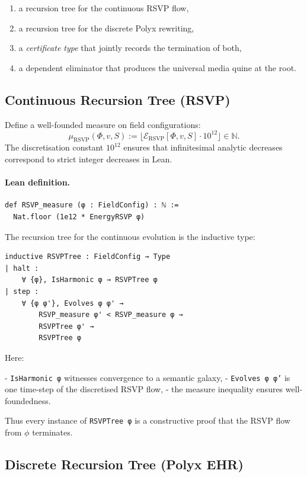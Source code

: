\begin{enumerate}
\item a recursion tree for the continuous RSVP flow,
\item a recursion tree for the discrete Polyx rewriting,
\item a \emph{certificate type} that jointly records the termination of both,
\item a dependent eliminator that produces the universal media quine at the root.
\end{enumerate}

\subsection{Continuous Recursion Tree (RSVP)}

Define a well-founded measure on field configurations:
\[
   \mu_{\mathrm{RSVP}}(\Phi,v,S)
     := \lfloor \mathcal{E}_{\mathrm{RSVP}}[\Phi,v,S] \cdot 10^{12} \rfloor
     \in \mathbb{N}.
\]
The discretisation constant $10^{12}$ ensures that infinitesimal analytic decreases correspond to strict integer decreases in Lean.

\paragraph{Lean definition.}

\begin{verbatim}
def RSVP_measure (φ : FieldConfig) : ℕ :=
  Nat.floor (1e12 * EnergyRSVP φ)
\end{verbatim}

The recursion tree for the continuous evolution is the inductive type:

\begin{verbatim}
inductive RSVPTree : FieldConfig → Type
| halt :
    ∀ {φ}, IsHarmonic φ → RSVPTree φ
| step :
    ∀ {φ φ'}, Evolves φ φ' →
        RSVP_measure φ' < RSVP_measure φ →
        RSVPTree φ' →
        RSVPTree φ
\end{verbatim}

Here:

- \texttt{IsHarmonic φ} witnesses convergence to a semantic galaxy,
- \texttt{Evolves φ φ'} is one time-step of the discretised RSVP flow,
- the measure inequality ensures well-foundedness.

Thus every instance of \texttt{RSVPTree φ} is a constructive proof that the RSVP flow from $\phi$ terminates.

\subsection{Discrete Recursion Tree (Polyx EHR)}

